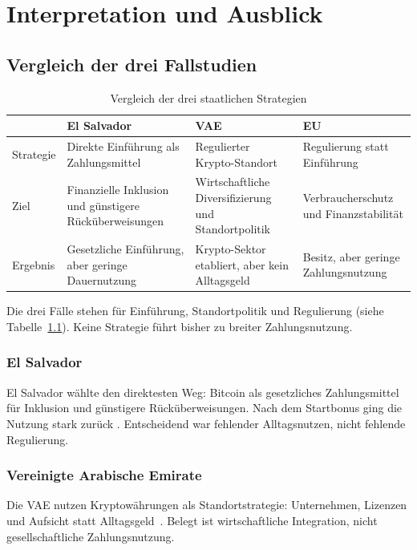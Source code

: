 \chapter{Interpretation und Ausblick}
\label{chap:interpretation}

\section{Vergleich der drei Fallstudien}

\begin{table}[H]
\centering
\begin{tabularx}{\textwidth}{|l|X|X|X|}
\hline
 & \textbf{El Salvador} & \textbf{VAE} & \textbf{EU} \\
\hline
Strategie & Direkte Einführung als Zahlungsmittel & Regulierter Krypto-Standort & Regulierung statt Einführung \\
\hline
Ziel & Finanzielle Inklusion und günstigere Rücküberweisungen & Wirtschaftliche Diversifizierung und Standortpolitik & Verbraucherschutz und Finanzstabilität \\
\hline
Ergebnis & Gesetzliche Einführung, aber geringe Dauernutzung & Krypto-Sektor etabliert, aber kein Alltagsgeld & Besitz, aber geringe Zahlungsnutzung \\
\hline
\end{tabularx}
\caption{Vergleich der drei staatlichen Strategien}
\label{tab:vergleich}
\end{table}

Die drei Fälle stehen für Einführung, Standortpolitik und Regulierung (siehe Tabelle~\ref{tab:vergleich}). Keine Strategie führt bisher zu breiter Zahlungsnutzung.

\subsection{El Salvador}

El Salvador wählte den direktesten Weg: Bitcoin als gesetzliches Zahlungsmittel für Inklusion und günstigere Rücküberweisungen. Nach dem Startbonus ging die Nutzung stark zurück \cite{Alvarez2023}. Entscheidend war fehlender Alltagsnutzen, nicht fehlende Regulierung.

\subsection{Vereinigte Arabische Emirate}

Die VAE nutzen Kryptowährungen als Standortstrategie: Unternehmen, Lizenzen und Aufsicht statt Alltagsgeld~\cite{VARA2025, ElGheriani2025}. Belegt ist wirtschaftliche Integration, nicht gesellschaftliche Zahlungsnutzung.

